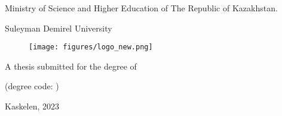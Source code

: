 \begin{titlepage}
\begin{center}
\large
Ministry of Science and Higher Education of The Republic of Kazakhstan. 

Suleyman Demirel University

\vspace{1cm}
\begin{figure}[h]
    \centering
    \texttt{[image: figures/logo\_new.png]}
\end{figure}

\vspace{2cm}
\Large
\myauthor

\vspace{1cm}
\Large
\textbf{\mytitle}

\vspace{1cm}
\large
A thesis submitted for the degree of

\mydegree

(degree code: \mydegreecode)

\vfill
Kaskelen, 2023

\end{center}
\end{titlepage}